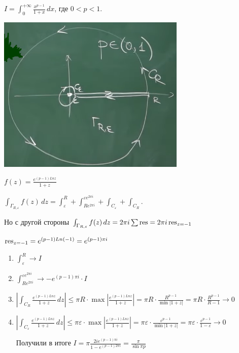 \begin{example}
    $I = \int_{0}^{+\infty} \frac{x^{p - 1}}{1 + x} \, dx $, где $0 < p < 1$.

    \begin{center}
        \includegraphics[width=9cm]{assets/04-functions-of-complex-variables/example-2-principal-value-integral.png}
    \end{center}

    $f(z) = \frac{e^{(p - 1) Ln z}}{1 + z}$

    $\int_{\Gamma_{R, \varepsilon}} f(z) \, dz = \int_{\varepsilon}^{R} + \int_{Re^{2\pi i}}^{\varepsilon e^{2\pi i}} + \int_{C_{\varepsilon}} + \int_{C_R}$.

    Но с другой стороны $\int_{\Gamma_{R, \varepsilon}} f(z) \, dz = 2 \pi i \sum \operatorname{res} = 2 \pi i \operatorname{res}_{z = -1}$

    $\operatorname{res}_{z = -1} = e^{(p - 1) Ln (-1)} = e^{(p - 1)\pi i}$

    \begin{enumerate}
        \item $\int_{\varepsilon}^{R} \rightarrow I$
        \item $\int_{Re^{2\pi i}}^{\varepsilon e^{2 \pi i}} \rightarrow -e^{(p - 1) \pi i} \cdot I$
        \item {
            $\left | \int_{C_{R}} \frac{e^{(p - 1)Ln z}}{1 + z} \, dz \right | \leqslant \pi R \cdot \max \left | \frac{e^{(p - 1) Ln z}}{1 + z} \right | =
            \pi R \cdot \frac{R^{p - 1}}{\min |1 + z|} = \pi R \cdot \frac{R^{p - 1}}{R - 1} \rightarrow 0$

        }
        \item {
            $\left | \int_{C_{\varepsilon}} \frac{e^{(p - 1)Ln z}}{1 + z} \, dz \right | \leqslant \pi \varepsilon \cdot \max \left | \frac{e^{(p - 1) Ln z}}{1 + z} \right | =
            \pi \varepsilon \cdot \frac{\varepsilon^{p - 1}}{\min |1 + z|} = \pi \varepsilon \cdot \frac{\varepsilon^{p - 1}}{1 - \varepsilon} \rightarrow 0$
        }

        Получили в итоге $I = \pi \frac{2i e^{(p - 1)\pi i}}{1 - e^{(p - 1)2\pi i}} = \frac{\pi}{\sin \pi p}$
    \end{enumerate}
\end{example}

